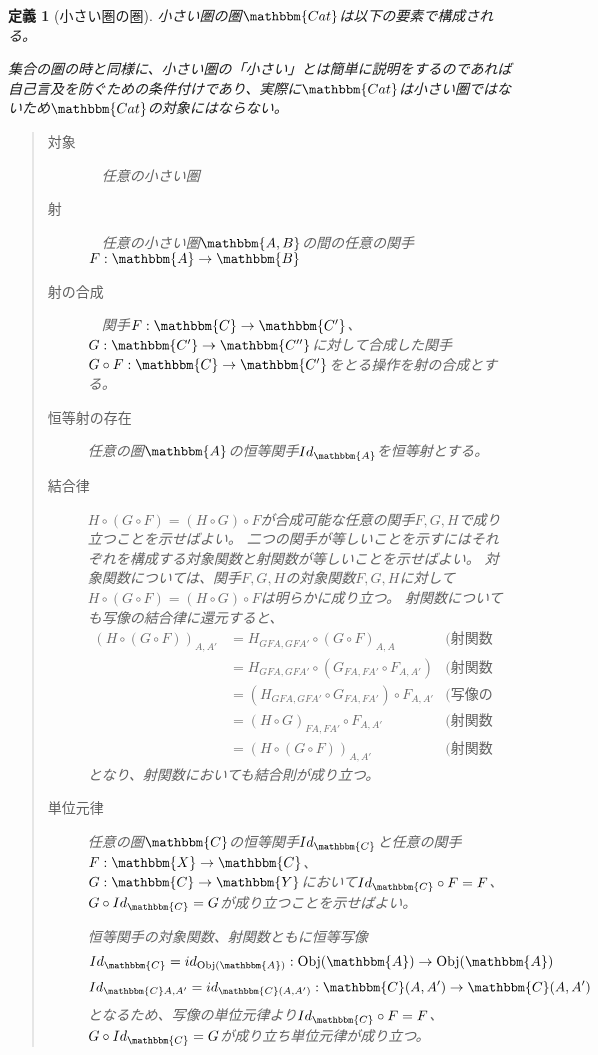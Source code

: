 \documentclass[uplatex,dvipdfmx]{jsarticle}
\newcommand{\cat}[1]{\mathbbm{#1}}
\newcommand{\arrow}{\rightarrow}
\newcommand{\functor}[3]{#1:\cat{#2}\arrow \cat{#3}}
\newcommand{\obj}[1]{\mathrm{Obj}(\cat{#1})}
\newcommand{\mor}[3]{#1:#2\arrow #3}
\newcommand{\arset}[3]{\cat{#1}(#2,#3)}
\newtheorem{define}{定義}[section]
\numberwithin{proof}{subsection}
\numberwithin{prop}{subsection}
\numberwithin{define}{subsection}
\begin{document}
	\begin{define}[小さい圏の圏]
		小さい圏の圏$\cat{Cat}$は以下の要素で構成される。

		集合の圏の時と同様に、小さい圏の「小さい」とは簡単に説明をするのであれば自己言及を防ぐための条件付けであり、実際に$\cat{Cat}$は小さい圏ではないため$\cat{Cat}$の対象にはならない。
		\begin{quote}
			\begin{description}
				\item[対象]　任意の小さい圏
				\item[射]　任意の小さい圏$\cat{A,B}$の間の任意の関手$\functor{F}{A}{B}$
				\item[射の合成]　関手$\functor{F}{C}{C'}$、$\functor{G}{C'}{C''}$に対して合成した関手$\functor{G\circ F}{C}{C'}$をとる操作を射の合成とする。
				\item[恒等射の存在]任意の圏$\cat{A}$の恒等関手$Id_{\cat{A}}$を恒等射とする。
				\item[結合律]
				$H\circ (G\circ F)=(H\circ G)\circ F$が合成可能な任意の関手$F,G,H$で成り立つことを示せばよい。
				二つの関手が等しいことを示すにはそれぞれを構成する対象関数と射関数が等しいことを示せばよい。
				対象関数については、関手$F,G,H$の対象関数$F,G,H$に対して$H\circ (G\circ F)=(H\circ G)\circ F$は明らかに成り立つ。
				射関数についても写像の結合律に還元すると、
				\begin{align*}
					(H\circ (G\circ F))_{A,A'}&=H_{GFA,GFA'}\circ (G\circ F)_{A,A}&\text{(射関数の合成の定義)}\\
					&=H_{GFA,GFA'}\circ (G_{FA,FA'}\circ F_{A,A'})&\text{(射関数の合成の定義)}\\
					&=(H_{GFA,GFA'}\circ G_{FA,FA'})\circ F_{A,A'}&\text{(写像の結合則)}\\
					&=(H\circ G)_{FA,FA'}\circ F_{A,A'}&\text{(射関数の合成の定義)}\\
					&=(H\circ (G\circ F))_{A,A'}&\text{(射関数の合成の定義)}
				\end{align*}
				となり、射関数においても結合則が成り立つ。
				\item[単位元律]
				任意の圏$\cat{C}$の恒等関手$Id_{\cat{C}}$と任意の関手$\functor{F}{X}{C}$、$\functor{G}{C}{Y}$において$Id_{\cat{C}}\circ F=F$、$G\circ Id_{\cat{C}}=G$が成り立つことを示せばよい。

				恒等関手の対象関数、射関数ともに恒等写像
				\[\mor{Id_\cat{C}=id_{\obj{A}}}{\obj{A}}{\obj{A}}\]
				\[\mor{Id_{\cat{C}A,A'}=id_{\arset{C}{A}{A'}}}{\arset{C}{A}{A'}}{\arset{C}{A}{A'}}\]
				となるため、写像の単位元律より$Id_{\cat{C}}\circ F=F$、$G\circ Id_{\cat{C}}=G$が成り立ち単位元律が成り立つ。
			\end{description}
		\end{quote}
	\end{define}
\end{document}

